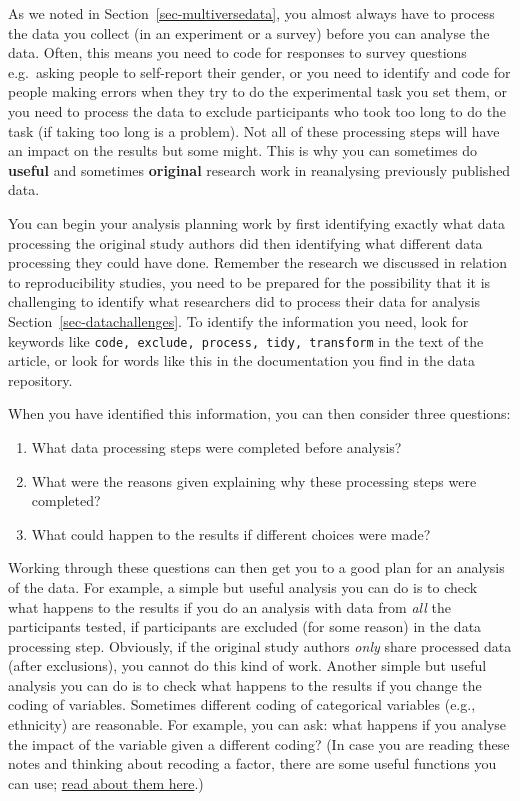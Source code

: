 \documentclass[
  letterpaper,
  DIV=11,
  numbers=noendperiod]{scrreprt}
\providecommand{\tightlist}{%
  \setlength{\itemsep}{0pt}\setlength{\parskip}{0pt}}\usepackage{longtable,booktabs,array}
\begin{document}
As we noted in Section~\ref{sec-multiversedata}, you almost always have
to process the data you collect (in an experiment or a survey) before
you can analyse the data. Often, this means you need to code for
responses to survey questions e.g.~asking people to self-report their
gender, or you need to identify and code for people making errors when
they try to do the experimental task you set them, or you need to
process the data to exclude participants who took too long to do the
task (if taking too long is a problem). Not all of these processing
steps will have an impact on the results but some might. This is why you
can sometimes do \textbf{useful} and sometimes \textbf{original}
research work in reanalysing previously published data.

You can begin your analysis planning work by first identifying exactly
what data processing the original study authors did then identifying
what different data processing they could have done. Remember the
research we discussed in relation to reproducibility studies, you need
to be prepared for the possibility that it is challenging to identify
what researchers did to process their data for analysis
Section~\ref{sec-datachallenges}. To identify the information you need,
look for keywords like
\texttt{code,\ exclude,\ process,\ tidy,\ transform} in the text of the
article, or look for words like this in the documentation you find in
the data repository.

When you have identified this information, you can then consider three
questions:

\begin{enumerate}
\def\labelenumi{\arabic{enumi}.}
\tightlist
\item
  What data processing steps were completed before analysis?
\item
  What were the reasons given explaining why these processing steps were
  completed?
\item
  What could happen to the results if different choices were made?
\end{enumerate}

Working through these questions can then get you to a good plan for an
analysis of the data. For example, a simple but useful analysis you can
do is to check what happens to the results if you do an analysis with
data from \emph{all} the participants tested, if participants are
excluded (for some reason) in the data processing step. Obviously, if
the original study authors \emph{only} share processed data (after
exclusions), you cannot do this kind of work. Another simple but useful
analysis you can do is to check what happens to the results if you
change the coding of variables. Sometimes different coding of
categorical variables (e.g., ethnicity) are reasonable. For example, you
can ask: what happens if you analyse the impact of the variable given a
different coding? (In case you are reading these notes and thinking
about recoding a factor, there are some useful functions you can use;
\href{https://forcats.tidyverse.org/reference/fct_recode.html}{read
about them here}.)
\end{document}
